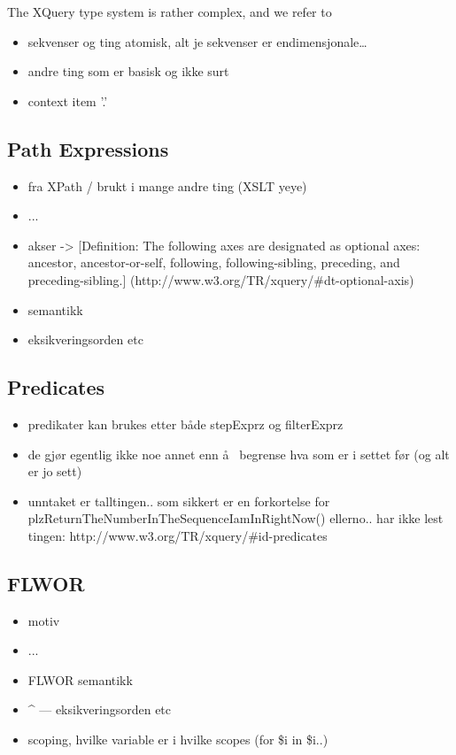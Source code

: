 The XQuery type system is rather complex, and we refer to 



\begin{itemize}
  \item sekvenser og ting atomisk, alt je sekvenser er endimensjonale\ldots
  \item andre ting som er basisk og ikke surt
  \item context item '.'
\end{itemize}

\subsection{Path Expressions}
\label{sect:theory:xqueryPathExpressions}
\begin{itemize}
\item fra XPath / brukt i mange andre ting (XSLT yeye)
\item ...
\item akser -> [Definition: The following axes are designated as optional axes:
ancestor, ancestor-or-self, following, following-sibling, preceding, and
preceding-sibling.] (http://www.w3.org/TR/xquery/\#dt-optional-axis)
\item semantikk 
\item eksikveringsorden etc
\end{itemize}

\subsection{Predicates}
\label{sect:theory:xqueryPredicates}
\begin{itemize}
  \item predikater kan brukes etter b\aa de stepExprz og filterExprz
  \item de gj\o r egentlig ikke noe annet enn \aa~ begrense hva som er i settet
  f\o r (og alt er jo sett)
  \item unntaket er talltingen.. som sikkert er en forkortelse for
  plzReturnTheNumberInTheSequenceIamInRightNow() ellerno.. har ikke lest
  tingen: http://www.w3.org/TR/xquery/\#id-predicates
\end{itemize}

\subsection{FLWOR}
\label{sect:theory:flwor}

\begin{itemize}
\item motiv
\item ...
\item FLWOR semantikk
\item \^{} --- eksikveringsorden etc
\item scoping, hvilke variable er i hvilke scopes (for \$i in \$i..)
\end{itemize}

